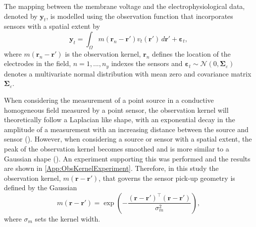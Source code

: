 \documentclass[5p,authoryear]{elsarticle}
\begin{document}
The mapping between the membrane voltage and the electrophysiological data, denoted by $\mathbf y_t$, is modelled using the observation function that incorporates sensors with a spatial extent by
\begin{equation}
    \label{eq:ObservationEquation}
	\mathbf{y}_t =
	\int_{\Omega}{
	    m\left(\mathbf{r}_n-\mathbf{r}'\right)v_t\left(\mathbf{r}'\right)
	\, d\mathbf{r}'} + 
	\boldsymbol{\varepsilon}_t, 
\end{equation}
where $m\left(\mathbf{r}_n-\mathbf{r}'\right)$ is the observation kernel, $\mathbf{r}_n$ defines the location of the electrodes in the field, $n=1,...,n_y$ indexes the sensors and $\boldsymbol{\varepsilon}_t \sim \mathcal{N}\left(0,\boldsymbol{\Sigma}_{\varepsilon}\right)$ denotes a multivariate normal distribution with mean zero and covariance matrix $\boldsymbol{\Sigma}_{\varepsilon}$. 

When considering the measurement of a point source in a conductive homogeneous field measured by a point sensor, the observation kernel will theoretically follow a Laplacian like shape, with an exponential decay in the amplitude of a measurement with an increasing distance between the source and sensor (\cite{Jackson1999}). However, when considering a source or sensor with a spatial extent, the peak of the observation kernel becomes smoothed and is more similar to a Gaussian shape (\cite{Jackson1999}). An experiment supporting this was performed and the results are shown in \ref{App:ObsKernelExperiment}. Therefore, in this study the observation kernel, $m(\mathbf{r}-\mathbf{r}')$, that governs the sensor pick-up geometry is defined by the Gaussian
\begin{equation}
	m\left(\mathbf{r}-\mathbf{r}'\right) = \exp{\left(-\frac{(\mathbf{r}-\mathbf{r}')^\top(\mathbf{r}-\mathbf{r}')}{\sigma_m^2}\right)},
\end{equation}
where $\sigma_m$ sets the kernel width. 
\end{document}
